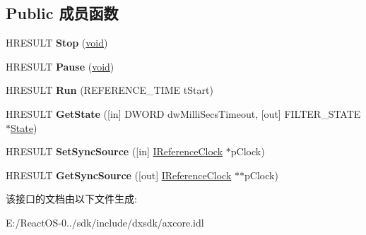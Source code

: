 \subsection*{Public 成员函数}
\begin{DoxyCompactItemize}
\item 
\mbox{\label{interface_i_media_filter_a942a1a35b402936d85a8fa551388f7d0}} 
H\+R\+E\+S\+U\+LT {\bfseries Stop} (\hyperlink{interfacevoid}{void})
\item 
\mbox{\label{interface_i_media_filter_a1bfa370c92e31bb5968a4b3295661b2a}} 
H\+R\+E\+S\+U\+LT {\bfseries Pause} (\hyperlink{interfacevoid}{void})
\item 
\mbox{\label{interface_i_media_filter_a0b5a1c7715965634321fb3a5cf922222}} 
H\+R\+E\+S\+U\+LT {\bfseries Run} (R\+E\+F\+E\+R\+E\+N\+C\+E\+\_\+\+T\+I\+ME t\+Start)
\item 
\mbox{\label{interface_i_media_filter_a2d92dce7307a7d8122d8205436e542ff}} 
H\+R\+E\+S\+U\+LT {\bfseries Get\+State} (\mbox{[}in\mbox{]} D\+W\+O\+RD dw\+Milli\+Secs\+Timeout, \mbox{[}out\mbox{]} F\+I\+L\+T\+E\+R\+\_\+\+S\+T\+A\+TE $\ast$\hyperlink{struct_state}{State})
\item 
\mbox{\label{interface_i_media_filter_a95e946ad4ac8c53bd578b0052c019e29}} 
H\+R\+E\+S\+U\+LT {\bfseries Set\+Sync\+Source} (\mbox{[}in\mbox{]} \hyperlink{interface_i_reference_clock}{I\+Reference\+Clock} $\ast$p\+Clock)
\item 
\mbox{\label{interface_i_media_filter_a7a7ca416a46b2d374c7583a49fa39a5a}} 
H\+R\+E\+S\+U\+LT {\bfseries Get\+Sync\+Source} (\mbox{[}out\mbox{]} \hyperlink{interface_i_reference_clock}{I\+Reference\+Clock} $\ast$$\ast$p\+Clock)
\end{DoxyCompactItemize}


该接口的文档由以下文件生成\+:\begin{DoxyCompactItemize}
\item 
E\+:/\+React\+O\+S-\/0../sdk/include/dxsdk/axcore.\+idl\end{DoxyCompactItemize}

